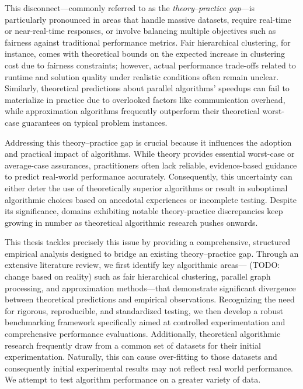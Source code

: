 \documentclass[12pt,twoside]{reedthesis}
\begin{document}
This disconnect—commonly referred to as the \emph{theory–practice
gap}—is particularly pronounced in areas that handle massive
datasets, require real-time or near-real-time responses, or involve
balancing multiple objectives such as fairness against traditional
performance metrics. Fair hierarchical clustering, for instance,
comes with theoretical bounds on the expected increase in clustering
cost due to fairness constraints; however, actual performance
trade-offs related to runtime and solution quality under realistic
conditions often remain unclear. Similarly, theoretical predictions
about parallel algorithms’ speedups can fail to materialize in
practice due to overlooked factors like communication overhead, while
approximation algorithms frequently outperform their theoretical
worst-case guarantees on typical problem instances.

Addressing this theory–practice gap is crucial because it influences
the adoption and practical impact of algorithms. While theory
provides essential worst-case or average-case assurances,
practitioners often lack reliable, evidence-based guidance to predict
real-world performance accurately. Consequently, this uncertainty can
either deter the use of theoretically superior algorithms or result
in suboptimal algorithmic choices based on anecdotal experiences or
incomplete testing. Despite its significance, domains
exhibiting notable theory-practice discrepancies keep growing in
number as theoretical algorithmic research pushes onwards.

This thesis tackles precisely this issue by providing a
comprehensive, structured empirical analysis designed to bridge an
existing theory–practice gap. Through an extensive literature review,
we first identify key algorithmic areas— (TODO: change based on
reality) such as fair hierarchical clustering, parallel graph
processing, and approximation methods—that
demonstrate significant divergence between theoretical predictions
and empirical observations. Recognizing the need for rigorous,
reproducible, and standardized testing, we then develop a robust
benchmarking framework specifically aimed at controlled
experimentation and comprehensive performance evaluations. Additionally,
theoretical algorithmic research frequently draw from a common set of
datasets for their initial experimentation. Naturally, this can cause
over-fitting to those datasets and consequently initial experimental
results may not reflect real world performance. We attempt to test
algorithm performance on a greater variety of data.
\end{document}

